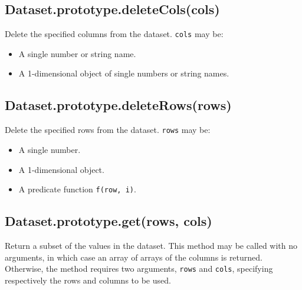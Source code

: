 \documentclass{article}
\begin{document}
    \subsection{Dataset.prototype.deleteCols(cols)}
    Delete the specified columns from the dataset. \texttt{cols} may be:


\begin{itemize}

\item A single number or string name.

\item A 1-dimensional object of single numbers or string names.

\end{itemize}

    \subsection{Dataset.prototype.deleteRows(rows)}
    Delete the specified rows from the dataset. \texttt{rows} may be:


\begin{itemize}

\item A single number.

\item A 1-dimensional object.

\item A predicate function \texttt{f(row, i)}.

\end{itemize}

    \subsection{Dataset.prototype.get(rows, cols)}
    Return a subset of the values in the dataset. This method may be called with
no arguments, in which case an array of arrays of the columns is returned.
Otherwise, the method requires two arguments, \texttt{rows} and \texttt{cols}, specifying
respectively the rows and columns to be used.
\end{document}
